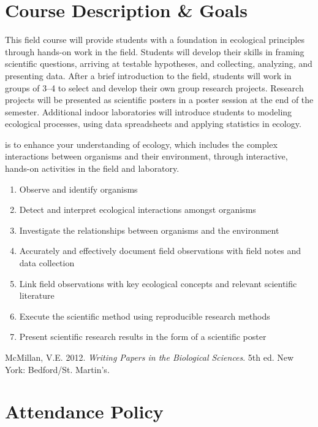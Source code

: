 \documentclass{tufte-handout}
\begin{document}
\begin{fullwidth}

\section{Course Description \& Goals}

This field course will provide students with a foundation in ecological principles through hands-on work in the field. Students will develop their skills in framing scientific questions, arriving at testable hypotheses, and collecting, analyzing, and presenting data. After a brief introduction to the field, students will work in groups of 3--4 to select and develop their own group research projects. Research projects will be presented as scientific posters in a poster session at the end of the semester. Additional indoor laboratories will introduce students to modeling ecological processes, using data spreadsheets and applying statistics in ecology.

 is to enhance your understanding of ecology, which includes the complex interactions between organisms and their environment, through interactive, hands-on activities in the field and laboratory. 


\begin{enumerate}
	\item Observe and identify organisms
	\item Detect and interpret ecological interactions amongst organisms
	\item Investigate the relationships between organisms and the environment
	\item Accurately and effectively document field observations with field notes and data collection
	\item Link field observations with key ecological concepts and relevant scientific literature
	\item Execute the scientific method using reproducible research methods
	\item Present scientific research results in the form of a scientific poster
\end{enumerate}

 McMillan, V.E. 2012. \emph{Writing Papers in the Biological Sciences}. 5th ed. New York: Bedford/St. Martin's.

\section{Attendance Policy}


\end{fullwidth}
\end{document}

